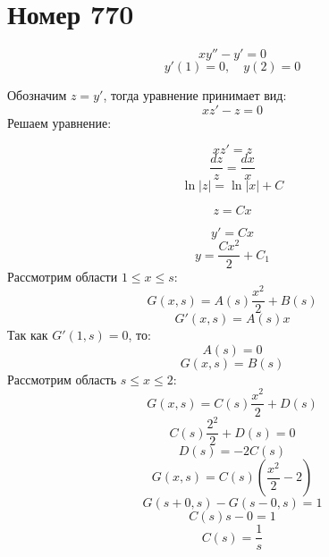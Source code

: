 \section*{Номер 770}

$$ xy'' - y' = 0 $$
$$ y'(1) = 0, \quad y(2) = 0 $$

\begin{solution}
    Обозначим $ z = y' $, тогда уравнение принимает вид:
    $$ xz' - z = 0 $$
    Решаем уравнение:

    $$ xz' = z $$
    $$ \dfrac{dz}{z} = \dfrac{dx}{x} $$
    $$ \ln |z| = \ln |x| + C $$

    $$ z = Cx $$

    $$ y' = Cx $$
    $$ y = \dfrac{Cx^2}{2} + C_1 $$
    Рассмотрим области $ 1 \leq x \leq s $:
    $$ G(x,s) = A(s) \dfrac{x^2}{2} + B(s) $$
    $$ G'(x,s) = A(s) x $$
    Так как $ G'(1,s) = 0 $, то:
    $$ A(s) = 0 $$
    $$ G(x,s) = B(s) $$
    Рассмотрим область $ s \leq x \leq 2 $:
    $$ G(x,s) = C(s) \dfrac{x^2}{2} + D(s) $$
    $$ C(s) \dfrac{2^2}{2} + D(s) = 0 $$
    $$ D(s) = -2C(s) $$
    $$ G(x,s) = C(s) \left( \dfrac{x^2}{2} - 2 \right) $$
    $$ G(s+0, s) - G(s-0, s) = 1 $$
    $$ C(s) s - 0 = 1 $$
    $$ C(s) = \dfrac{1}{s} $$

\end{solution}\pagebreak

